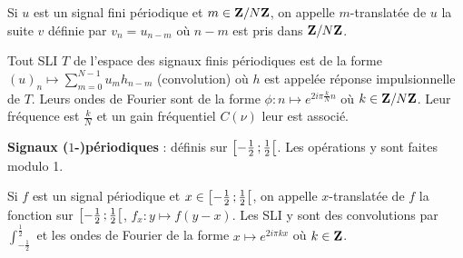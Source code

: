 \begin{defn}
	Si $u$ est un signal fini périodique et $m \in \mathbf{Z} / N\mathbf{Z}$, on appelle $m$-translatée de $u$ la suite $v$ définie par $v_n = u_{n - m}$ où $n - m$ est pris dans $\mathbf{Z} / N\mathbf{Z}$.
\end{defn}

\begin{defn}
	Tout SLI $T$ de l'espace des signaux finis périodiques est de la forme $(u)_n \mapsto \sum_{m = 0}^{N - 1} u_m h_{n - m}$ (convolution) où $h$ est appelée réponse impulsionnelle de $T$.
	Leurs ondes de Fourier sont de la forme $\phi \colon n \mapsto e^{2i\pi \frac{k}{N} n}$ où $k \in \mathbf{Z} / N\mathbf{Z}$.
	Leur fréquence est $\frac{k}{N}$ et un gain fréquentiel $C(\nu)$ leur est associé.
\end{defn}

\begin{defn}
	\textbf{Signaux ($1$-)périodiques} : définis sur $\mathopen{}\mathclose{\left[-\frac{1}{2}\mathclose{}\mathpunct{};\frac{1}{2}\right[}$. Les opérations y sont faites modulo 1.
\end{defn}

\begin{defn}
	Si $f$ est un signal périodique et $x \in \mathopen{}\mathclose{\left[-\frac{1}{2}\mathclose{}\mathpunct{};\frac{1}{2}\right[}$, on appelle $x$-translatée de $f$ la fonction sur $\mathopen{}\mathclose{\left[-\frac{1}{2}\mathclose{}\mathpunct{};\frac{1}{2}\right[}$, $f_x \colon y \mapsto f(y - x)$.
	Les SLI y sont des convolutions par $\int_{-\frac{1}{2}}^{\frac{1}{2}}$ et les ondes de Fourier de la forme $x \mapsto e^{2i\pi kx}$ où $k \in \mathbf{Z}$.
\end{defn}